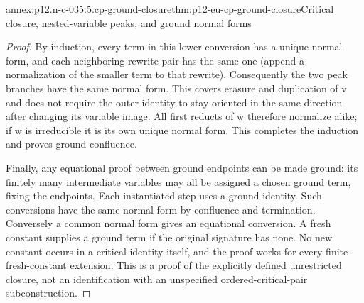 \begin{annexitem}{annex:p12.n-c-035.5.cp-ground-closure}{thm:p12-eu-cp-ground-closure}{Critical closure, nested-variable peaks, and ground normal forms}
\begin{proof}
By induction, every term in this lower conversion has a unique
normal form, and each neighboring rewrite pair has the same one
(append a normalization of the smaller term to that rewrite).
Consequently the two peak branches have the same normal form.
This covers erasure and duplication of v and does not require the
outer identity to stay oriented in the same direction after changing
its variable image. All first reducts of w therefore normalize alike;
if w is irreducible it is its own unique normal form. This completes
the induction and proves ground confluence.

Finally, any equational proof between ground endpoints can be made
ground: its finitely many intermediate variables may all be assigned
a chosen ground term, fixing the endpoints. Each instantiated step
uses a ground identity. Such conversions have the same normal form
by confluence and termination. Conversely a common normal form gives
an equational conversion. A fresh constant supplies a ground term
if the original signature has none. No new constant occurs in a
critical identity itself, and the proof works for every finite
fresh-constant extension. This is a proof of the explicitly defined
unrestricted closure, not an identification with an unspecified
ordered-critical-pair subconstruction.
\end{proof}
\end{annexitem}

